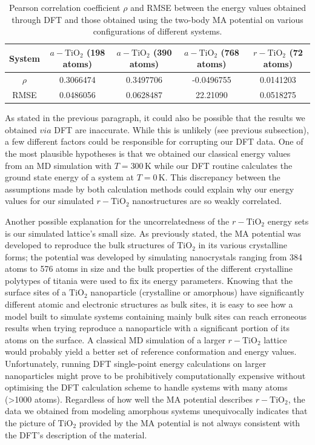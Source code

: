 \documentclass[aps,prb,twocolumn,amsmath,amssymb,superscriptaddress,longbibliography]{revtex4-1}
\newcommand\tab[1][1cm]{\hspace*{#1}} %
\begin{document}
\begin{table}[]
\begin{tabular}{c|c|c|c|c}
System & $a-\text{TiO}_2$ (198 atoms) & $a-\text{TiO}_2$ (390 atoms) & $a-\text{TiO}_2$ (768 atoms)  & $r-\text{TiO}_2$ (72 atoms) \\ \hline
$\rho$ & 0.3066474                    & 0.3497706                    & -0.0496755                   & 0.0141203                   \\
RMSE   & 0.0486056                    & 0.0628487                    & 22.21090                       & 0.0518275                   \\
\end{tabular}
\label{stats}
\caption{Pearson correlation coefficient $\rho$ and RMSE between the energy values obtained through DFT and those obtained using the two-body MA potential on various configurations of different systems.}
\end{table}

\tab As stated in the previous paragraph, it could also be possible that the results we obtained $\textit{via}$ DFT are inaccurate.
While this is unlikely (see previous subsection), a few different factors could be responsible for corrupting our DFT data.
One of the most plausible hypotheses is that we obtained our classical energy values from an MD simulation with $T=300\,$K while our DFT routine calculates the ground state energy of a system at $T=0\,$K.
This discrepancy between the assumptions made by both calculation methods could explain why our energy values for our simulated $r-\text{TiO}_2$ nanostructures are so weakly correlated.

\tab Another possible explanation for the uncorrelatedness of the $r-\text{TiO}_2$ energy sets is our simulated lattice's small size.
As previously stated, the MA potential was developed to reproduce the bulk structures of $\text{TiO}_2$ in its various crystalline forms; the potential was developed by simulating nanocrystals ranging from 384 atoms to 576 atoms in size and the bulk properties of the different crystalline polytypes of titania were used to fix its energy parameters.
Knowing that the surface sites of a $\text{TiO}_2$ nanoparticle (crystalline or amorphous) have significantly different atomic and electronic structures as bulk sites\cite{vvh1,realistic_nnp,vvh2}, it is easy to see how a model built to simulate systems containing mainly bulk sites can reach erroneous results when trying reproduce a nanoparticle with a significant portion of its atoms on the surface.
A classical MD simulation of a larger $r-\text{TiO}_2$ lattice would probably yield a better set of reference conformation and energy values.
Unfortunately, running DFT single-point energy calculations on larger nanoparticles might prove to be prohibitively computationally expensive without optimising the DFT calculation scheme to handle systems with many atoms (>1000 atoms).
Regardless of how well the MA potential describes $r-\text{TiO}_2$, the data we obtained from modeling amorphous systems unequivocally indicates that the picture of $\text{TiO}_2$ provided by the MA potential is not always consistent with the DFT's description of the material.
 
\end{document}
